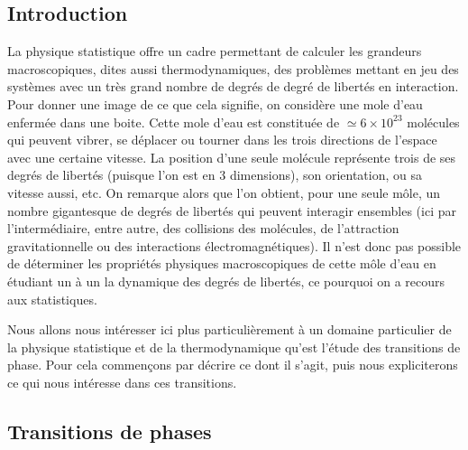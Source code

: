 \documentclass[10pt]{article}
\begin{document}

\tableofcontents

\pagebreak
\begin{multicols}{2}

\section{Introduction}

La physique statistique  \cite{rohtuA} offre un cadre permettant de calculer les grandeurs macroscopiques, dites aussi thermodynamiques, des problèmes mettant en jeu des systèmes avec un très grand nombre de degrés de degré de libertés en interaction. Pour donner une image de ce que cela signifie, on considère une mole d'eau enfermée dans une boite. Cette mole d'eau est constituée de $\simeq 6\times 10^{23}$ molécules qui peuvent vibrer, se déplacer ou tourner dans les trois directions de l'espace avec une certaine vitesse. La position d'une seule molécule représente trois de ses degrés de libertés (puisque l'on est en 3 dimensions), son orientation, ou sa vitesse aussi, etc. On remarque alors que l'on obtient, pour une seule môle, un nombre gigantesque de degrés de libertés qui peuvent interagir ensembles (ici par l'intermédiaire, entre autre, des collisions des molécules, de l'attraction gravitationnelle ou des interactions électromagnétiques). Il n'est donc pas possible de déterminer les propriétés physiques macroscopiques de cette môle d'eau en étudiant un à un la dynamique des degrés de libertés, ce pourquoi on a recours aux statistiques. 

Nous allons nous intéresser ici plus particulièrement à un domaine particulier de la physique statistique et de la thermodynamique qu'est l'étude des transitions de phase. Pour cela commençons par décrire ce dont il s'agit, puis nous expliciterons ce qui nous intéresse dans ces transitions. \\


\subsection{Transitions de phases}


\end{multicols}
\end{document}
